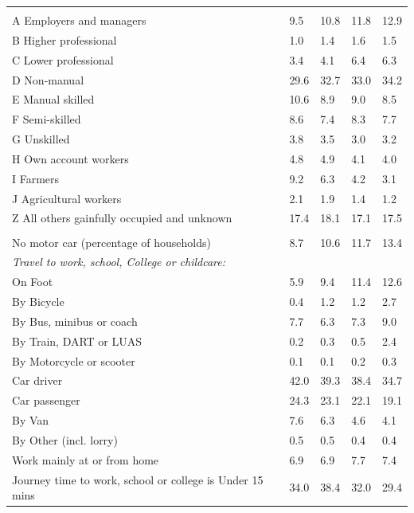 \documentclass{article}
\begin{document}
\begin{table}[h]
\begin{tabular}{KTTTT}
\hline
    \\ 
    \hline
A Employers and managers &  9.5& 10.8& 11.8& 12.9\\
B Higher professional & 1.0& 1.4& 1.6& 1.5\\
C Lower professional & 3.4& 4.1& 6.4& 6.3\\
D Non-manual & 29.6& 32.7& 33.0& 34.2\\
E Manual skilled & 10.6&  8.9&  9.0&  8.5\\
F Semi-skilled & 8.6& 7.4& 8.3& 7.7\\
G Unskilled & 3.8& 3.5& 3.0& 3.2\\
H Own account workers & 4.8& 4.9& 4.1& 4.0\\
I Farmers & 9.2& 6.3& 4.2& 3.1\\
J Agricultural workers & 2.1& 1.9& 1.4& 1.2\\
Z All others gainfully occupied and unknown & 17.4& 18.1& 17.1& 17.5\\
\hline
{}\hline
    \\ 
    \hline
No motor car (percentage of households) &  8.7& 10.6& 11.7& 
13.4\\
    \hline 
\emph{Travel to work, school, College or childcare:} & & & \\
\quad On Foot &  5.9&  9.4& 11.4& 12.6\\ 
\quad By Bicycle & 0.4& 1.2& 1.2& 2.7\\ 
\quad By Bus, minibus or coach & 7.7& 6.3& 7.3& 9.0\\
\quad By Train, DART or LUAS & 0.2& 0.3& 0.5& 2.4\\
\quad By Motorcycle or scooter & 0.1& 0.1& 0.2& 0.3\\
\quad Car driver & 42.0 & 39.3& 38.4& 34.7\\
\quad Car passenger & 24.3& 23.1& 22.1& 19.1\\
\quad By Van & 7.6& 6.3& 4.6& 4.1\\
\quad By Other (incl. lorry) & 0.5& 0.5& 0.4& 0.4\\
    \hline
Work mainly at or from home & 6.9& 6.9& 7.7& 7.4\\
Journey time to work, school or college is Under 15 mins & 34.0& 38.4& 32.0& 29.4\\

\end{tabular}
\end{table}
\end{document}
